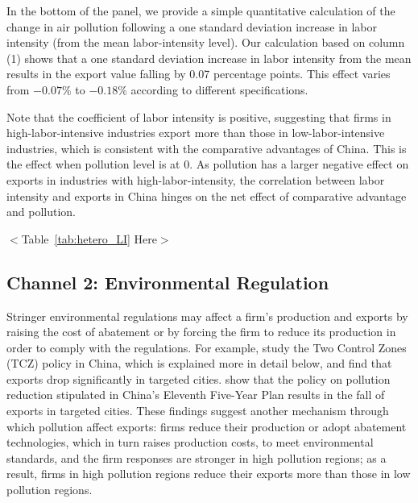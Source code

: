 \documentclass[12pt]{article}
\begin{document}
In the bottom of the panel, we provide a simple quantitative calculation of the change in air pollution following
a one standard deviation increase in labor intensity (from the mean labor-intensity level). Our calculation based on column (1) shows that a one standard deviation increase in labor intensity from the mean results in the export value falling by 0.07 percentage points. This effect varies from $-0.07\%$ to $-0.18\%$ according to different specifications.  

Note that the coefficient of labor intensity is positive, suggesting that
firms in high-labor-intensive industries export more than those in
low-labor-intensive industries, which is consistent with the comparative
advantages of China. This is the effect when pollution level is at 0. As
pollution has a larger negative effect on exports in industries with
high-labor-intensity, the correlation between labor intensity and exports
in China hinges on the net effect of comparative advantage and pollution.

\begin{center}
  $<$Table~\ref{tab:hetero_LI} Here$>$
  \end{center}

\subsection{Channel 2: Environmental Regulation}
\label{sec:Channel 2}
Stringer environmental regulations may affect a firm's production and exports by raising the cost of abatement or by 
forcing the firm to reduce its production in order to comply with the regulations. For example, \cite%
{hering2014environmental} study the Two Control Zones (TCZ) policy in China, which is explained more in detail below, and find that exports drop significantly in targeted cities. \cite%
{shi2018environmental} show that the policy on pollution reduction stipulated in China's
Eleventh Five-Year Plan results in the fall of exports in targeted cities. These findings suggest another mechanism through which pollution affect exports: firms reduce their production or adopt abatement technologies, which in turn raises production costs, to meet environmental standards, and the firm responses are stronger in high pollution regions; as a result, firms in high pollution regions reduce their exports more than those in low pollution regions.
\end{document}
